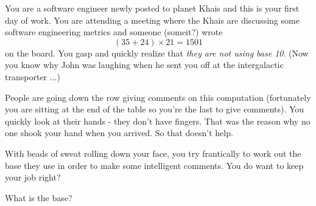 You are a software engineer newly posted to planet Khais
and this is your first day of work.
You are attending a meeting where the Khais are discussing some software
engineering metrics and someone (someit?) wrote
\[
(35 + 24) \times 21 = 1501
\]
on the board.
You gasp and quickly realize that \textit{they are not using base 10}.
(Now you know why John was laughing when he sent you off at the
intergalactic transporter ...)

People are going down the row giving comments on this computation (fortunately you
are sitting at the end of the table so you're the last to give comments).
You quickly look at their hands - they don't have fingers.
That was the reason why no one shook your hand when you arrived.
So that doesn't help.

With beads of sweat rolling down your face,
you try frantically to work out the base they use in order to make some
intelligent comments. You do want to keep your job right?

What is the base?
